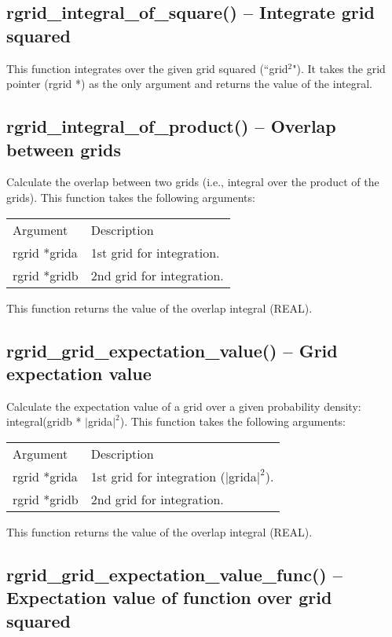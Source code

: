 \documentclass[12pt,letterpaper]{report}
\begin{document}
\subsection{rgrid\_integral\_of\_square() -- Integrate grid squared}

This function integrates over the given grid squared (``grid$^2$"). It takes the grid pointer (rgrid *) as the only argument and returns the value of the integral.

\subsection{rgrid\_integral\_of\_product() -- Overlap between grids}

Calculate the overlap between two grids (i.e., integral over the product of the grids). This function takes the following arguments:
\begin{longtable}{p{} p{}}
Argument & Description\\
\cline{1-2}
rgrid *grida & 1st grid for integration.\\
rgrid *gridb & 2nd grid for integration.\\
\end{longtable}
\noindent
This function returns the value of the overlap integral (REAL).

\subsection{rgrid\_grid\_expectation\_value() -- Grid expectation value}

Calculate the expectation value of a grid over a given probability density: integral(gridb * $|$grida$|^2$). This function takes the following arguments:
\begin{longtable}{p{} p{}}
Argument & Description\\
\cline{1-2}
rgrid *grida & 1st grid for integration ($|$grida$|^2$).\\
rgrid *gridb & 2nd grid for integration.\\
\end{longtable}
\noindent
This function returns the value of the overlap integral (REAL).

\subsection{rgrid\_grid\_expectation\_value\_func() -- Expectation value of function over grid squared}
\end{document}
